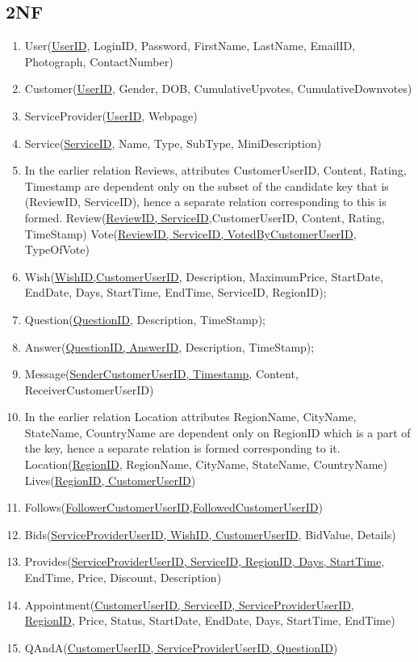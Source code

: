 \documentclass[a4paper]{article}
\begin{document}
\subsection{2NF}
\begin{enumerate}

\item User(\underline{UserID}, LoginID, Password, FirstName, LastName, EmailID, Photograph, ContactNumber)

\item Customer(\underline{UserID}, Gender, DOB, CumulativeUpvotes, CumulativeDownvotes)

\item ServiceProvider(\underline{UserID}, Webpage)

\item Service(\underline{ServiceID}, Name, Type, SubType, MiniDescription)

\item In the earlier relation Reviews, attributes CustomerUserID, Content, Rating, Timestamp are dependent only on the subset of the candidate key that is (ReviewID, ServiceID), hence a separate relation corresponding to this is formed.
\subitem Review(\underline{ReviewID, ServiceID},CustomerUserID, Content, Rating, TimeStamp)
\subitem Vote(\underline{ReviewID, ServiceID, VotedByCustomerUserID}, TypeOfVote)

\item Wish(\underline{WishID,CustomerUserID}, Description, MaximumPrice, StartDate, EndDate, Days, StartTime, EndTime, ServiceID, RegionID);

\item Question(\underline{QuestionID}, Description, TimeStamp);

\item Answer(\underline{QuestionID, AnswerID}, Description, TimeStamp);

\item Message(\underline {SenderCustomerUserID, Timestamp}, Content, ReceiverCustomerUserID)

\item In the earlier relation Location attributes RegionName, CityName, StateName, CountryName are dependent only on RegionID which is a part of the key, hence a separate relation is formed corresponding to it.
\subitem Location(\underline{RegionID}, RegionName, CityName, StateName, CountryName)
\subitem Lives(\underline{RegionID, CustomerUserID})

\item Follows(\underline{FollowerCustomerUserID,FollowedCustomerUserID})
\item Bids(\underline{ServiceProviderUserID, WishID, CustomerUserID}, BidValue, Details)
\item Provides(\underline{ServiceProviderUserID, ServiceID, RegionID, Days, StartTime}, EndTime, Price, Discount, Description)
\item Appointment(\underline{CustomerUserID, ServiceID, ServiceProviderUserID},\\ \underline{RegionID}, Price, Status, StartDate, EndDate, Days, StartTime, EndTime)  
\item QAndA(\underline{CustomerUserID, ServiceProviderUserID, QuestionID})


\end{enumerate}
\end{document}
